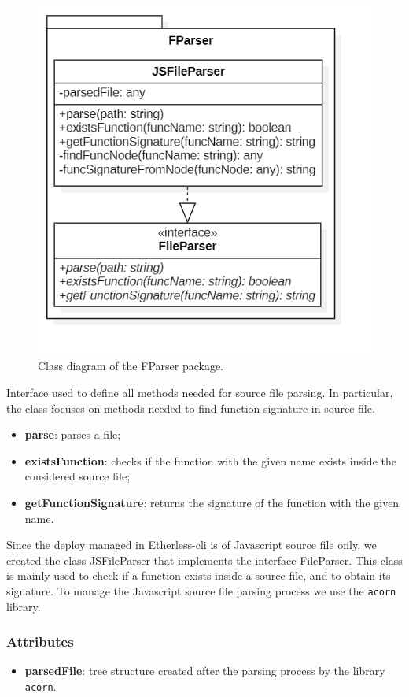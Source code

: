 		\begin{figure} [h!]
			\centering
			\includegraphics[width=0.5\linewidth]{diagrammi/etherless-cli/FParser}
			\caption{Class diagram of the FParser package.}
		\end{figure}
		
			Interface used to define all methods needed for source file parsing. In particular, the class focuses on methods needed to find function signature in source file. 
		
					\begin{itemize}
						\item \textbf{parse}: parses a file;   
						\item \textbf{existsFunction}: checks if the function with the given name exists inside the considered source file;
						\item \textbf{getFunctionSignature}: returns the signature of the function with the given name.
					\end{itemize}
		
			Since the deploy managed in Etherless-cli is of Javascript source file only, we created the class JSFileParser that implements the interface FileParser. This class is mainly used to check if a function exists inside a source file, and to obtain its signature. To manage the Javascript source file parsing process we use the \texttt{acorn} library. 
			
				\subsubsection*{Attributes}
					\begin{itemize}
						\item \textbf{parsedFile}: tree structure created after the parsing process by the library \texttt{acorn}.
					\end{itemize}
				
